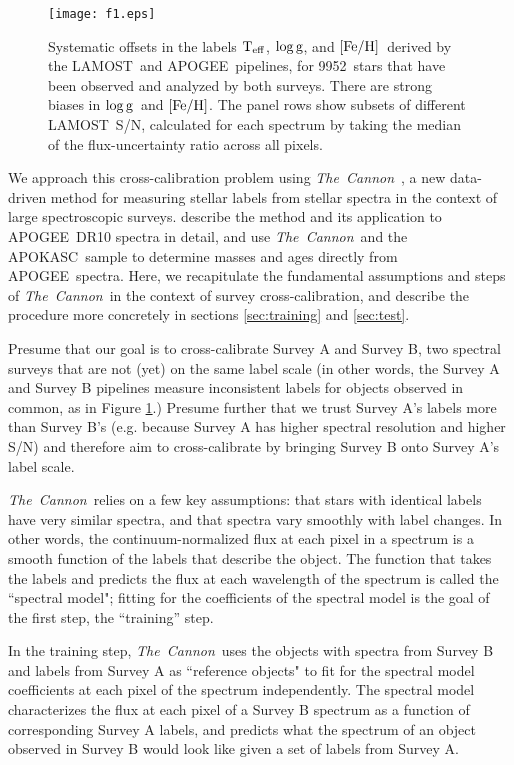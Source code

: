 \documentclass[12pt, letterpaper, preprint]{aastex}
\newcommand{\tc}{\textsl{The~Cannon}}
\newcommand{\apogee}{APOGEE}
\newcommand{\lamost}{LAMOST}
\newcommand{\apokasc}{APOKASC}
\newcommand{\teff}{\mbox{$\rm T_{eff}$}}
\newcommand{\feh}{\mbox{$\rm [Fe/H]$}}
\newcommand{\logg}{\mbox{$\rm \log g$}}
\newcommand{\ntrobj}{9952}
\newcommand{\snr}{S/N}
\begin{document}
\begin{figure}[!p]
\centering
\texttt{[image: f1.eps]}
\caption{Systematic offsets in the labels
\teff, \logg, and \feh\
derived by the \lamost\ and \apogee\ pipelines, for \ntrobj\ stars that
have been observed and analyzed by both surveys.
There are strong biases in \logg\ and \feh.
The panel rows show subsets of different \lamost\ \snr, calculated for each spectrum by taking
the median of the flux-uncertainty ratio across all pixels.
}
\label{fig:apogee-lamost}
\end{figure}

We approach this cross-calibration problem using \tc\ \citep{Ness2015}, a new data-driven method for measuring stellar labels from stellar spectra in the context of large spectroscopic surveys. 
\citet{Ness2015} describe the method and its application to \apogee\ DR10 spectra in detail, and \citet{NessAges} use \tc\ and the \apokasc\ sample to determine masses and ages directly from \apogee\ spectra. 
Here, we recapitulate the fundamental assumptions and steps
of \tc\ in the context of survey cross-calibration, and
describe the procedure more concretely in sections 
\ref{sec:training} and \ref{sec:test}. 

Presume that our goal is to cross-calibrate Survey A and Survey B,
two spectral surveys that are not (yet) on the same label scale (in other words, the Survey A and Survey B pipelines measure inconsistent labels for objects
observed in common, as in Figure \ref{fig:apogee-lamost}.) 
Presume further that we trust Survey A's labels more than Survey B's
(e.g. because Survey A has higher spectral resolution and higher \snr) and therefore aim to cross-calibrate by bringing Survey B onto Survey A's label scale.

\tc\ relies on a few key assumptions: 
that stars with identical labels have very similar spectra, and that spectra vary smoothly with label changes.  
In other words, the continuum-normalized flux at each pixel in a spectrum is a smooth function of the labels that describe the object. 
The function that takes the labels and predicts the 
flux at each wavelength of the spectrum is called the ``spectral model"; 
fitting for the coefficients of the spectral model is the goal of the first step, 
the ``training'' step.

In the training step, \tc\ uses the objects with spectra from Survey B and labels from Survey A
as ``reference objects" to fit for the spectral model coefficients at each pixel of the spectrum independently.
The spectral model characterizes the flux at each pixel of a Survey B 
spectrum as a function of corresponding Survey A labels, and
predicts what the spectrum of an object observed in Survey B
would look like given a set of labels from Survey A. 
\end{document}

